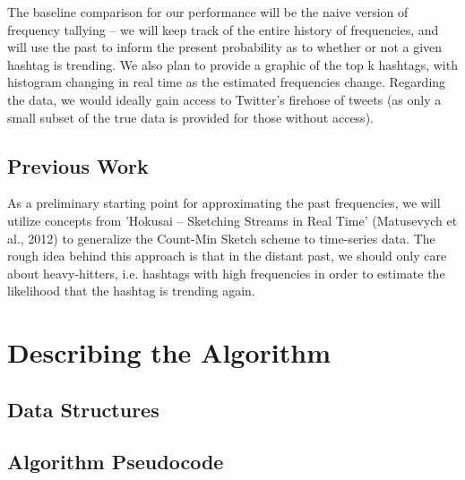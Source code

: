 \documentclass[twoside]{article}
\begin{document}
\begin{multicols}{2}
The baseline comparison for our performance will be the naive version of frequency tallying -- we will keep track of the entire history of frequencies, and will use the past to inform the present probability as to whether or not a given hashtag is trending. We also plan to provide a graphic of the top k hashtags, with histogram changing in real time as the estimated frequencies change. Regarding the data, we would ideally gain access to Twitter's firehose of tweets (as only a small subset of the true data is provided for those without access). 

\subsection{Previous Work}

As a preliminary starting point for approximating the past frequencies, we will utilize concepts from 'Hokusai -- Sketching Streams in Real Time' (Matusevych et al., 2012) to generalize the Count-Min Sketch scheme to time-series data. The rough idea behind this approach is that in the distant past, we should only care about heavy-hitters, i.e. hashtags with high frequencies in order to estimate the likelihood that the hashtag is trending again.



\section{Describing the Algorithm}


\lipsum[1]

\subsection{Data Structures}
\lipsum[2-3] %

\subsection{Algorithm Pseudocode} 


\end{multicols}
\end{document}
